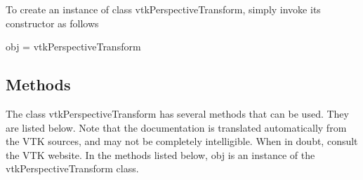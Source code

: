 To create an instance of class vtk\-Perspective\-Transform, simply invoke its constructor as follows \begin{DoxyVerb}  obj = vtkPerspectiveTransform
\end{DoxyVerb}
 \hypertarget{vtkwidgets_vtkxyplotwidget_Methods}{}\subsection{Methods}\label{vtkwidgets_vtkxyplotwidget_Methods}
The class vtk\-Perspective\-Transform has several methods that can be used. They are listed below. Note that the documentation is translated automatically from the V\-T\-K sources, and may not be completely intelligible. When in doubt, consult the V\-T\-K website. In the methods listed below, {\ttfamily obj} is an instance of the vtk\-Perspective\-Transform class. 
